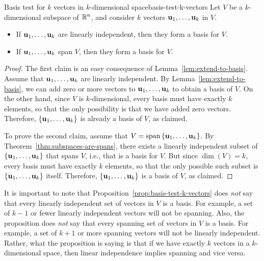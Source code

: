 \begin{proposition}{Basis test for $k$ vectors in $k$-dimensional space}{basis-test-k-vectors}
  Let $V$ be a $k$-dimensional subspace of $\mathbb{R}^n$, and consider $k$
  vectors $\vect{u}_1,\ldots,\vect{u}_k$ in $V$.
  \begin{itemize}
  \item If $\vect{u}_1,\ldots,\vect{u}_k$ are linearly
    independent, then they form a basis for $V$.
  \item If $\vect{u}_1,\ldots,\vect{u}_k$ span $V$, then they
    form a basis for $V$.
  \end{itemize}
\end{proposition}

\begin{proof}
  The first claim is an easy consequence of
  Lemma~\ref{lem:extend-to-basis}. Assume that
  $\vect{u}_1,\ldots,\vect{u}_k$ are linearly independent. By
  Lemma~\ref{lem:extend-to-basis}, we can add zero or more vectors to
  $\vect{u}_1,\ldots,\vect{u}_k$ to obtain a basis of $V$. On the
  other hand, since $V$ is $k$-dimensional, every basis must have
  exactly $k$ elements, so that the only possibility is that we have
  added zero vectors. Therefore,
  $\set{\vect{u}_1,\ldots,\vect{u}_k}$ is already a basis of $V$,
  as claimed.

  To prove the second claim, assume that
  $V=\sspan\set{\vect{u}_1,\ldots,\vect{u}_k}$. By
  Theorem~\ref{thm:subspaces-are-spans}, there exists a linearly
  independent subset of $\set{\vect{u}_1,\ldots,\vect{u}_k}$ that
  spans $V$, i.e., that is a basis for $V$. But since $\dim(V)=k$,
  every basis must have exactly $k$ elements, so that the only
  possible such subset is $\set{\vect{u}_1,\ldots,\vect{u}_k}$
  itself. Therefore, $\set{\vect{u}_1,\ldots,\vect{u}_k}$ is a
  basis of $V$, as claimed.
\end{proof}

It is important to note that
Proposition~\ref{prop:basis-test-k-vectors} does {\em not} say that
every linearly independent set of vectors in $V$ is a basis. For
example, a set of $k-1$ or fewer linearly independent vectors will not
be spanning. Also, the proposition does {\em not} say that every
spanning set of vectors in $V$ is a basis. For example, a set of $k+1$
or more spanning vectors will not be linearly independent. Rather,
what the proposition is saying is that if we have exactly $k$ vectors
in a $k$-dimensional space, then linear independence implies spanning
and vice versa.

